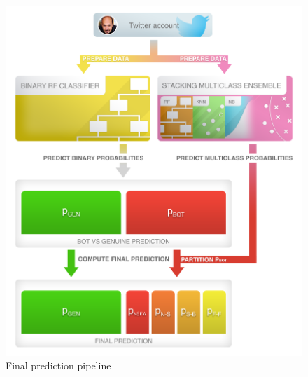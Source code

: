\begin{figure}[t!]
	\begin{center}
		\includegraphics[width=\columnwidth]{chapter5/figure/pred_pipeline.png}
	\end{center}
	\caption{Final prediction pipeline}
	\label{fig:prediction_pipeline}
\end{figure}